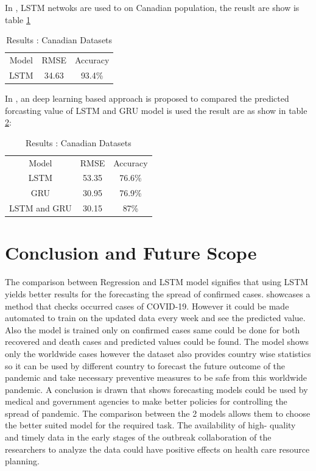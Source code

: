In \cite{chimmula2020time}, LSTM netwoks are used to on Canadian population,
the reuslt are show is table \ref{table:four}

\begin{table}[ht!]
	\centering
	\caption{Results \cite{chimmula2020time}: Canadian Datasets}
	\begin{tabular}{c c c}
		Model & RMSE & Accuracy \\
		LSTM & 34.63 & 93.4\%

	\end{tabular}
	\label{table:four}
\end{table}


In \cite{bandyopadhyay2020machine}, an deep learning based approach is
proposed to compared the predicted forcasting value of LSTM and GRU model is
used the result are as show in table \ref{table:seven}:

\begin{table}[ht!]
	\centering
	\caption{Results \cite{chimmula2020time}: Canadian Datasets}
	\begin{tabular}{c c c}
		Model & RMSE & Accuracy \\
		LSTM & 53.35 & 76.6\% \\
		GRU & 30.95 & 76.9\% \\
		LSTM and GRU & 30.15 & 87\%

	\end{tabular}
	\label{table:seven}
\end{table}

\section{Conclusion and Future Scope}

The comparison between Regression and LSTM model signifies that using LSTM
yields better results for the forecasting the spread of confirmed cases.
showcases a method that checks occurred cases of
COVID-19. However it could be made automated to train on the updated data
every week and see the predicted value. Also the model is trained only on confirmed cases
same could be done for both recovered and death cases and predicted values could be found.
The model shows only the worldwide cases however the dataset also provides country wise
statistics so it can be used by different country to forecast the future outcome of the
pandemic and take necessary preventive measures to be safe from this worldwide
pandemic.
A conclusion is drawn that shows forecasting models could be used by medical
and government agencies to make better policies for controlling the spread of
pandemic. The comparison between the 2 models allows them to choose the better
suited model for the required task.
The availability of high- quality and timely data in the early stages of the outbreak collaboration of
the researchers to analyze the data could have positive effects on health care
resource planning.


